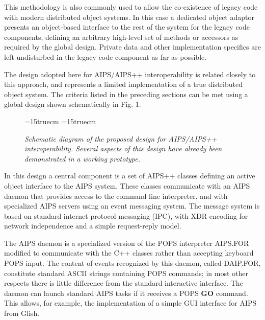  This methodology is also commonly used to allow the co-existence of
legacy code with modern distributed object systems. In this case a
dedicated object adaptor presents an object-based interface to the
rest of the system for the legacy code components, defining an
arbitrary high-level set of methods or accessors as required by the
global design. Private data and other implementation specifics are
left undisturbed in the legacy code component as far as possible.

 The design adopted here for AIPS/AIPS++ interoperability is related
closely to this approach, and represents a limited implementation of a
true distributed object system. The criteria listed in the preceding
sections can be met using a global design shown schematically in Fig. 1.

  \begin{figure}[htbp]			%
    \def\epsfile{FIG/MEMO95}            %
    \def\figlbl{\epsfile}              %
    \label{\figlbl}			%
    \begin{center}
      \epsfxsize=15truecm              %
      \epsfysize=15truecm              %
      \leavevmode \epsfbox{\epsfile.PLT}   %
    \end{center}
    \caption[...]{			%
     }
    \begin{center}\parbox{0.9\textwidth}{\it %
Schematic diagram of the proposed design for AIPS/AIPS++ interoperability.
Several aspects of this design have already been demonstrated in a working
prototype.
    }\end{center}			%
  \end{figure}				%
 In this design a central component is a set of AIPS++ classes
defining an active object interface to the AIPS system. These
classes communicate with an AIPS daemon that provides access to
the command line interpreter, and with specialized AIPS servers
using an event messaging system. The message system is based on
standard internet protocol messaging (IPC), with XDR encoding for
network independence and a simple request-reply model.

 The AIPS daemon is a specialized version of the POPS interpreter
AIPS.FOR modified to communicate with the C++ classes rather than
accepting keyboard POPS input. The content of events recognized by
this daemon, called DAIP.FOR, constitute standard ASCII strings
containing POPS commands; in most other respects there is little
difference from the standard interactive interface. The daemon can
launch standard AIPS tasks if it receives a POPS {\bf GO}
command. This allows, for example, the implementation of a simple GUI
interface for AIPS from Glish.

